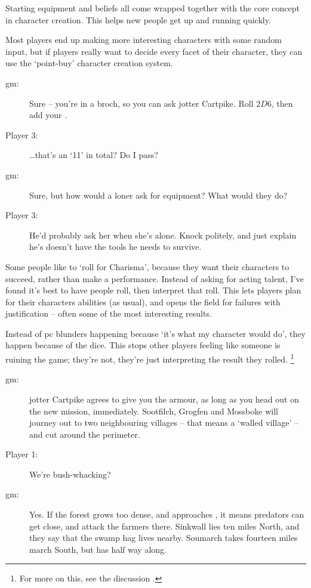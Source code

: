 \begin{multicols}{3}
\bigLine
\vspace{\baselineskip}
Starting equipment and beliefs all come wrapped together with the core concept in character creation.
This helps new people get up and running quickly.

Most players end up making more interesting characters with some random input, but if players really want to decide every facet of their character, they can use the `point-buy' character creation system.

\begin{description}
  \item[\gls{gm}:]
  Sure -- you're in a \gls{broch}, so you can ask \gls{jotter} Cartpike.
  Roll $2D6$, then add your .
  \item[Player 3:]
  \ldots that's an `11' in total?
  Do I pass?
  \item[\gls{gm}:]
  Sure, but how would a loner ask for equipment?
  What would they do?
  \item[Player 3:]
  He'd probably ask her when she's alone.
  Knock politely, and just explain he's doesn't have the tools he needs to survive.
\end{description}

Some people like to `roll for Charisma', because they want their characters to succeed, rather than make a performance.
Instead of asking for acting talent, I've found it's best to have people roll, then interpret that roll.
This lets players plan for their characters abilities (as usual), and opens the field for failures with justification -- often some of the most interesting results.

Instead of \gls{pc} blunders happening because `it's what my character would do', they happen because of the dice.
This stops other players feeling like someone is ruining the game; they're not, they're just interpreting the result they rolled.%
\footnote{For more on this, see the discussion .}

\bigLine
\vspace{\baselineskip}

\begin{description}
  \item[\gls{gm}:]
  \Gls{jotter} Cartpike agrees to give you the armour, as long as you head out on the new mission, immediately.
  Sootfilch, Grogfen and Mossboke will journey out to two neighbouring \glspl{village} -- that means a `walled village' -- and cut around the perimeter.
  \item[Player 1:]
  We're bush-whacking?
  \item[\gls{gm}:]
  Yes.
  If the forest grows too dense, and approaches , it means predators can get close, and attack the farmers there.
  Sinkwall lies ten miles North, and they say that the swamp hag lives nearby.
  Soumarch takes fourteen miles march South, but has  half way along.


\end{description}
\end{multicols}
